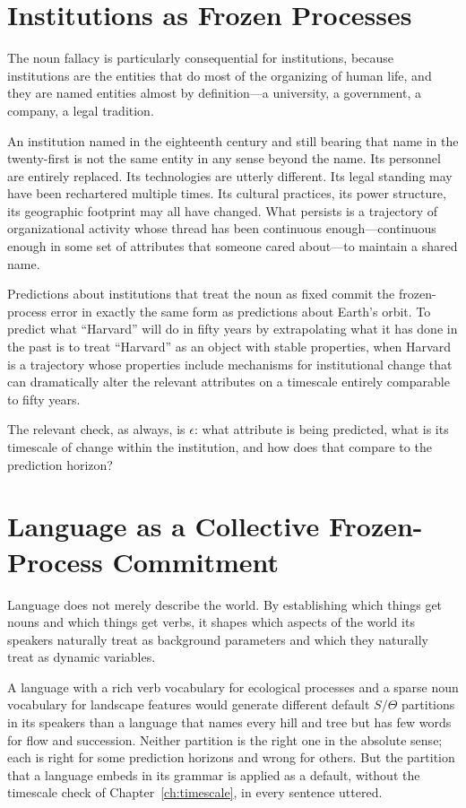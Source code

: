 \documentclass[11pt]{book}
\theoremstyle{plain}
\theoremstyle{definition}
\theoremstyle{remark}
\begin{document}
\section{Institutions as Frozen Processes}

The noun fallacy is particularly consequential for institutions, because institutions are the entities that do most of the organizing of human life, and they are named entities almost by definition---a university, a government, a company, a legal tradition.

An institution named in the eighteenth century and still bearing that name in the twenty-first is not the same entity in any sense beyond the name. Its personnel are entirely replaced. Its technologies are utterly different. Its legal standing may have been rechartered multiple times. Its cultural practices, its power structure, its geographic footprint may all have changed. What persists is a trajectory of organizational activity whose thread has been continuous enough---continuous enough in some set of attributes that someone cared about---to maintain a shared name.

Predictions about institutions that treat the noun as fixed commit the frozen-process error in exactly the same form as predictions about Earth's orbit. To predict what ``Harvard'' will do in fifty years by extrapolating what it has done in the past is to treat ``Harvard'' as an object with stable properties, when Harvard is a trajectory whose properties include mechanisms for institutional change that can dramatically alter the relevant attributes on a timescale entirely comparable to fifty years.

The relevant check, as always, is $\epsilon$: what attribute is being predicted, what is its timescale of change within the institution, and how does that compare to the prediction horizon?

\section{Language as a Collective Frozen-Process Commitment}

Language does not merely describe the world. By establishing which things get nouns and which things get verbs, it shapes which aspects of the world its speakers naturally treat as background parameters and which they naturally treat as dynamic variables.

A language with a rich verb vocabulary for ecological processes and a sparse noun vocabulary for landscape features would generate different default $S/\Theta$ partitions in its speakers than a language that names every hill and tree but has few words for flow and succession. Neither partition is the right one in the absolute sense; each is right for some prediction horizons and wrong for others. But the partition that a language embeds in its grammar is applied as a default, without the timescale check of Chapter~\ref{ch:timescale}, in every sentence uttered.
\end{document}
